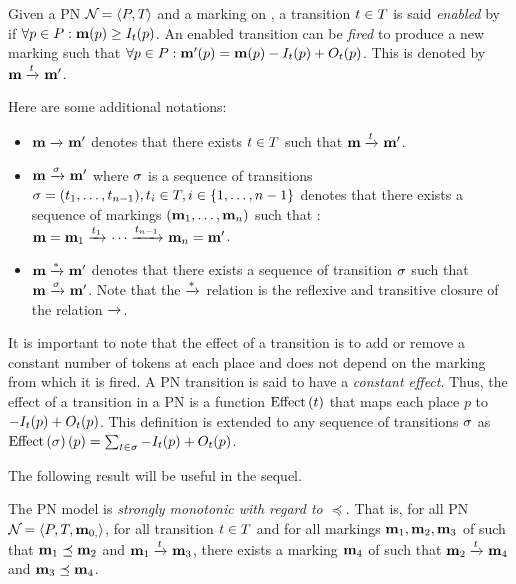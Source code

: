 Given a \ac{PN} $\mathcal{N}_{} = \left\langle P_{}, T_{}\right\rangle$ and a marking \mar on \namePN, a transition $t \in T$ is said \emph{enabled} by \mar if $\forall p \in \places : \mar(p) \geq \inw[t][p]$.
An enabled transition can be \emph{fired} to produce a new marking \marp such that $\forall p \in \places : \marp(p) = \mar(p) - \inw[t][p] + \outw[t][p]$.
This is denoted by $\mathbf{m} \xrightarrow{t}_{} \mathbf{m'}$.

Here are some additional notations:
\begin{itemize}
  \item $\mathbf{m} \xrightarrow{}_{} \mathbf{m'}$ denotes that there exists $t \in T$ such that $\mathbf{m} \xrightarrow{t}_{} \mathbf{m'}$.
  \item $\mar \fire{\seqt} \marp$ where $\seqt$ is a sequence of transitions $\defSeqt{1}{n-1}, t_i \in \transitions, i \in \range{1}{n-1}$ denotes that there exists a sequence of markings $\bodySeqm{1}{n}$ such that : $\mathbf{m} = \mathbf{m}_1 \xrightarrow{t_1}_{} \cdots \xrightarrow{t_{n-1}}_{} \mathbf{m}_n = \mathbf{m'}$.
  \item $\mathbf{m} \xrightarrow{*}_{} \mathbf{m'}$ denotes that there exists a sequence of transition $\seqt$ such that $\mar \fire{\seqt} \marp$.
    Note that the $\xrightarrow{*}_{}$ relation is the reflexive and transitive closure of the relation $\xrightarrow{}_{}$.
\end{itemize}

It is important to note that the effect of a transition is to add or remove a constant number of tokens at each place and does not depend on the marking from which it is fired.
A \ac{PN} transition is said to have a \emph{constant effect}.
Thus, the effect of a transition in a \ac{PN} is a function $\effect{t}$ that maps each place $p$ to $- \inw[t][p] + \outw[t][p]$.
This definition is extended to any sequence of transitions $\seqt$ as $\effect{\seqt}[p] = \sum_{t \in \seqt} -\inw[t][p] + \outw[t][p]$.

The following result will be useful in the sequel.

\begin{lemm}
  The \ac{PN} model is \emph{strongly monotonic with regard to $\preceq$}. That is, for all \ac{PN} $\mathcal{N}_{} = \left\langle P_{}, T_{}, \mathbf{m}_{0,}\right\rangle$, for all transition $t \in T$ and for all markings $\mathbf{m}_1, \mathbf{m}_2, \mathbf{m}_3$ of \namePN such that $\mathbf{m}_1 \preceq \mathbf{m}_2$ and $\mathbf{m}_1 \xrightarrow{t}_{} \mathbf{m}_3$, there exists a marking $\mathbf{m}_4$ of \namePN such that $\mathbf{m}_2 \xrightarrow{t}_{} \mathbf{m}_4$ and $\mathbf{m}_3 \preceq \mathbf{m}_4$.
\end{lemm}

